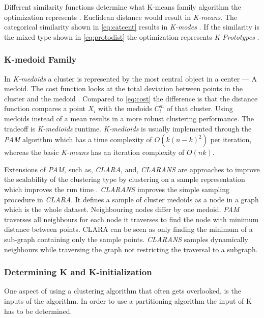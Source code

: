 \documentclass[../report.tex]{subfiles}
\begin{document}
Different similarity functions determine what K-means family algorithm the optimization represents \cite{huang2005automated}. Euclidean distance would result in \textit{K-means}. The categorical similarity shown in \ref{eq:catcent} results in \textit{K-modes} \cite{Ng1999}. If the similarity is the mixed type shown in \ref{eq:protodist} the optimization represents \textit{K-Prototypes} \cite{Huang97clusteringlarge}. %


\subsubsection{K-medoid Family}
In \textit{K-medoids} a cluster is represented by the most central object in a center --- A medoid. The cost function looks at the total deviation between points in the cluster and the medoid \cite{Ng2002, }. Compared to \ref{eq:cost} the difference is that the distance function compares a point $X_i$ with the medoids $C_l^m$ of that cluster. Using medoids instead of a mean results in a more robust clustering performance. The tradeoff is \textit{K-medioids} runtime. \textit{K-medioids} is usually implemented through the \textit{PAM} algorithm which has a time complexity of $O(k(n-k)^{2})$ per iteration, whereas the basic \textit{K-means} has an iteration complexity of $O(nk)$.

Extensions of \textit{PAM}, such as, \textit{CLARA}, and, \textit{CLARANS} are approaches to improve the scalability of the clustering type by clustering on a sample representation which improves the run time \cite{Ng2002}. \textit{CLARANS} improves the simple sampling procedure in \textit{CLARA}. It defines a sample of cluster medoids as a node in a graph which is the whole dataset. Neighbouring nodes differ by one medoid. \textit{PAM} traverses all neighbours for each node it traverses to find the node with minimum distance between points. CLARA can be seen as only finding the minimum of a sub-graph containing only the sample points. \textit{CLARANS} samples dynamically neighbours while traversing the graph not restricting the traversal to a subgraph.

\subsubsection{Determining K and K-initialization}
One aspect of using a clustering algorithm that often gets overlooked, is the inputs of the algorithm.
In order to use a partitioning algorithm the input of K has to be determined.
\end{document}
